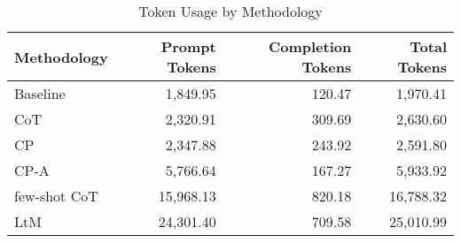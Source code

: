 \begin{table}
\caption{Token Usage by Methodology}
\label{tab:token-usage}
\begin{tabular}{lrrr}
\toprule
Methodology & Prompt Tokens & Completion Tokens & Total Tokens \\
\midrule
Baseline & 1,849.95 & 120.47 & 1,970.41 \\
CoT & 2,320.91 & 309.69 & 2,630.60 \\
CP & 2,347.88 & 243.92 & 2,591.80 \\
CP-A & 5,766.64 & 167.27 & 5,933.92 \\
few-shot CoT & 15,968.13 & 820.18 & 16,788.32 \\
LtM & 24,301.40 & 709.58 & 25,010.99 \\
\bottomrule
\end{tabular}
\end{table}
